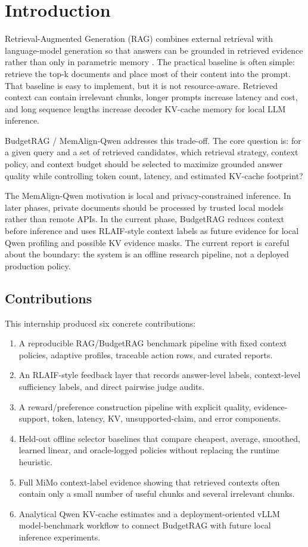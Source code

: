 \section{Introduction}

Retrieval-Augmented Generation (RAG) combines external retrieval with language-model generation so that answers can be grounded in retrieved evidence rather than only in parametric memory \cite{lewis2020rag}. The practical baseline is often simple: retrieve the top-k documents and place most of their content into the prompt. That baseline is easy to implement, but it is not resource-aware. Retrieved context can contain irrelevant chunks, longer prompts increase latency and cost, and long sequence lengths increase decoder KV-cache memory for local LLM inference.

BudgetRAG / MemAlign-Qwen addresses this trade-off. The core question is: for a given query and a set of retrieved candidates, which retrieval strategy, context policy, and context budget should be selected to maximize grounded answer quality while controlling token count, latency, and estimated KV-cache footprint?

The MemAlign-Qwen motivation is local and privacy-constrained inference. In later phases, private documents should be processed by trusted local models rather than remote APIs. In the current phase, BudgetRAG reduces context before inference and uses RLAIF-style context labels as future evidence for local Qwen profiling and possible KV evidence masks. The current report is careful about the boundary: the system is an offline research pipeline, not a deployed production policy.

\subsection{Contributions}

This internship produced six concrete contributions:

\begin{enumerate}[leftmargin=*]
  \item A reproducible RAG/BudgetRAG benchmark pipeline with fixed context policies, adaptive profiles, traceable action rows, and curated reports.
  \item An RLAIF-style feedback layer that records answer-level labels, context-level sufficiency labels, and direct pairwise judge audits.
  \item A reward/preference construction pipeline with explicit quality, evidence-support, token, latency, KV, unsupported-claim, and error components.
  \item Held-out offline selector baselines that compare cheapest, average, smoothed, learned linear, and oracle-logged policies without replacing the runtime heuristic.
  \item Full MiMo context-label evidence showing that retrieved contexts often contain only a small number of useful chunks and several irrelevant chunks.
  \item Analytical Qwen KV-cache estimates and a deployment-oriented vLLM model-benchmark workflow to connect BudgetRAG with future local inference experiments.
\end{enumerate}


